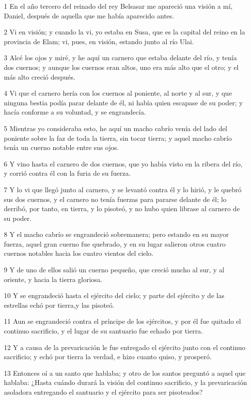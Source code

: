\par 1 En el año tercero del reinado del rey Belsasar me apareció una visión a mí, Daniel, después de aquella que me había aparecido antes.
\par 2 Vi en visión; y cuando la vi, yo estaba en Susa, que es la capital del reino en la provincia de Elam; vi, pues, en visión, estando junto al río Ulai.
\par 3 Alcé los ojos y miré, y he aquí un carnero que estaba delante del río, y tenía dos cuernos; y aunque los cuernos eran altos, uno era más alto que el otro; y el más alto creció después.
\par 4 Vi que el carnero hería con los cuernos al poniente, al norte y al sur, y que ninguna bestia podía parar delante de él, ni había quien escapase de su poder; y hacía conforme a su voluntad, y se engrandecía.
\par 5 Mientras yo consideraba esto, he aquí un macho cabrío venía del lado del poniente sobre la faz de toda la tierra, sin tocar tierra; y aquel macho cabrío tenía un cuerno notable entre sus ojos.
\par 6 Y vino hasta el carnero de dos cuernos, que yo había visto en la ribera del río, y corrió contra él con la furia de su fuerza.
\par 7 Y lo vi que llegó junto al carnero, y se levantó contra él y lo hirió, y le quebró sus dos cuernos, y el carnero no tenía fuerzas para pararse delante de él; lo derribó, por tanto, en tierra, y lo pisoteó, y no hubo quien librase al carnero de su poder.
\par 8 Y el macho cabrío se engrandeció sobremanera; pero estando en su mayor fuerza, aquel gran cuerno fue quebrado, y en su lugar salieron otros cuatro cuernos notables hacia los cuatro vientos del cielo.
\par 9 Y de uno de ellos salió un cuerno pequeño, que creció mucho al sur, y al oriente, y hacia la tierra gloriosa.
\par 10 Y se engrandeció hasta el ejército del cielo; y parte del ejército y de las estrellas echó por tierra,y las pisoteó.
\par 11 Aun se engrandeció contra el príncipe de los ejércitos, y por él fue quitado el continuo sacrificio, y el lugar de su santuario fue echado por tierra.
\par 12 Y a causa de la prevaricación le fue entregado el ejército junto con el continuo sacrificio; y echó por tierra la verdad, e hizo cuanto quiso, y prosperó.
\par 13 Entonces oí a un santo que hablaba; y otro de los santos preguntó a aquel que hablaba: ¿Hasta cuándo durará la visión del continuo sacrificio, y la prevaricación asoladora entregando el santuario y el ejército para ser pisoteados?

